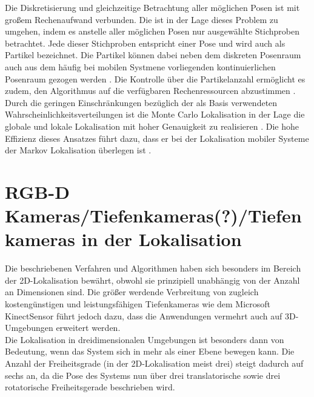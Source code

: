 Die Diskretisierung und gleichzeitige Betrachtung aller möglichen Posen ist mit großem Rechenaufwand verbunden. Die  ist in der Lage dieses Problem zu umgehen, indem es anstelle aller möglichen Posen nur ausgewählte Stichproben betrachtet. Jede dieser Stichproben entspricht einer Pose und wird auch als Partikel bezeichnet. Die Partikel können dabei neben dem diskreten Posenraum auch aus dem häufig bei mobilen Systmene vorliegenden kontinuierlichen Posenraum gezogen werden \cite{Fox2001}. Die Kontrolle über die Partikelanzahl ermöglicht es zudem, den Algorithmus auf die verfügbaren Rechenressourcen abzustimmen \cite{Thrun2001}.\\
Durch die geringen Einschränkungen bezüglich der als Basis verwendeten Wahrscheinlichkeitsverteilungen ist die Monte Carlo Lokalisation in der Lage die globale und lokale Lokalisation mit hoher Genauigkeit zu realisieren \cite{Thrun2005}. Die hohe Effizienz dieses Ansatzes führt dazu, dass er bei der Lokalisation mobiler Systeme der Markov Lokalisation \red[deutlich] überlegen ist \cite{Fox2001}.




\section{RGB-D Kameras/Tiefenkameras(?)/Tiefenkameras in der Lokalisation}
Die beschriebenen Verfahren und Algorithmen haben sich besonders im Bereich der 2D-Lokalisation bewährt, obwohl sie prinzipiell unabhängig von der Anzahl an Dimensionen sind. Die größer werdende Verbreitung von zugleich kostengünstigen und leistungsfähigen Tiefenkameras wie dem Microsoft Kinect\red[Tm] Sensor führt jedoch dazu, dass die Anwendungen vermehrt auch auf 3D-Umgebungen erweitert werden.\\
Die Lokalisation in dreidimensionalen Umgebungen ist besonders dann von Bedeutung, wenn das System sich in mehr als einer Ebene bewegen kann. Die Anzahl der Freiheitsgrade (in der 2D-Lokalisation meist drei) steigt dadurch auf sechs an, da die Pose des Systems nun über drei translatorische sowie drei rotatorische Freiheitsgerade beschrieben wird.\\

